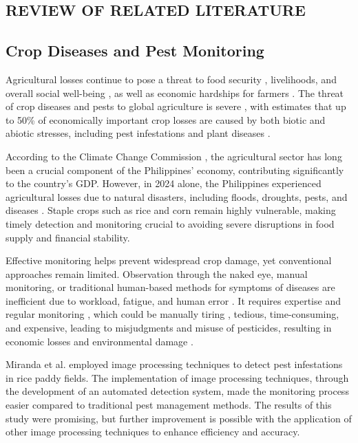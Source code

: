 \documentclass{icsthesis}
\begin{document}
\begin{mainmatter}
		\section{REVIEW OF RELATED LITERATURE}
            \subsection{Crop Diseases and Pest Monitoring}
            Agricultural losses continue to pose a threat to food security \cite{omaye-2024}, livelihoods, and overall social well-being \cite{lu-2025}, as well as economic hardships for farmers \cite{hassan-2021}. The threat of crop diseases and pests to global agriculture is severe \cite{zhang-2019}, with estimates that up to 50\% of economically important crop losses are caused by both biotic and abiotic stresses, including pest infestations and plant diseases \cite{junaid-2024}.

            According to the Climate Change Commission \cite{climate-change-commission-2017}, the agricultural sector has long been a crucial component of the Philippines' economy, contributing significantly to the country's GDP. However, in 2024 alone, the Philippines experienced agricultural losses due to natural disasters, including floods, droughts, pests, and diseases \cite{international-rice-research-institute-2025}. Staple crops such as rice and corn remain highly vulnerable, making timely detection and monitoring crucial to avoiding severe disruptions in food supply and financial stability.

            Effective monitoring helps prevent widespread crop damage, yet conventional approaches remain limited. Observation through the naked eye, manual monitoring, or traditional human-based methods for symptoms of diseases are inefficient due to workload, fatigue, and human error \cite{kolesnikova-2023}. It requires expertise and regular monitoring \cite{lu-2017, hassan-2021}, which could be manually tiring \cite{ritharson-2023}, tedious, time-consuming, and expensive, leading to misjudgments and misuse of pesticides, resulting in economic losses and environmental damage \cite{zheng-2025}.

            Miranda et al. \cite{miranda-2014} employed image processing techniques to detect pest infestations in rice paddy fields. The implementation of image processing techniques, through the development of an automated detection system, made the monitoring process easier compared to traditional pest management methods. The results of this study were promising, but further improvement is possible with the application of other image processing techniques to enhance efficiency and accuracy.


\end{mainmatter}
\end{document}
